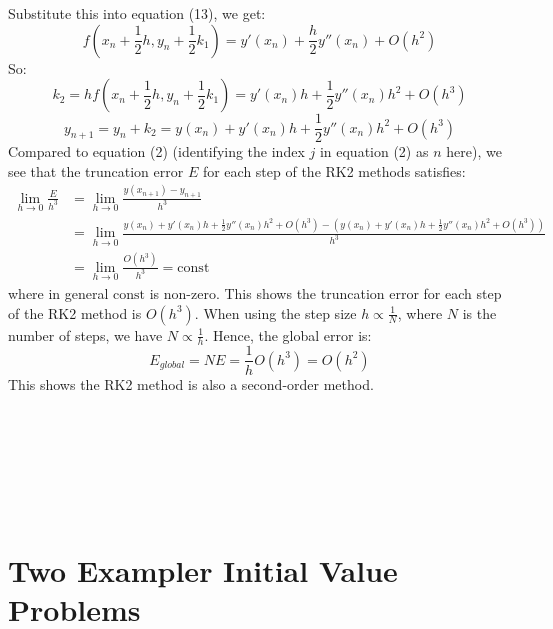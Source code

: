 \documentclass{article}
\begin{document}
Substitute this into equation (13), we get:
\begin{equation}
  f( x_n+ \frac{1}{2}h, y_n + \frac{1}{2}k_1)  = y'(x_n) + \frac{h}{2} y''(x_n)  +O(h^2)
\end{equation}
So:
\begin{equation}
  k_2 = h f( x_n+ \frac{1}{2}h, y_n + \frac{1}{2}k_1)  = y'(x_n)h + \frac{1}{2} y''(x_n) h^2 + O(h^3)
\end{equation}
\begin{equation}
  y_{n+1} = y_n +k_2 = y(x_n) +  y'(x_n)h + \frac{1}{2} y''(x_n) h^2 + O(h^3)
\end{equation}
Compared to equation (2) (identifying the index \(j\) in equation (2) as \(n\) here), we see that
the truncation error \(E\) for each step of the RK2 methods satisfies:
\begin{align}
    \lim_{h\to 0} \frac{E}{h^3}
    & = \lim_{h\to 0} \frac{y(x_{n+1}) - y_{n+1}}{h^3}\\
    & = \lim_{h\to 0} \frac{y(x_n) +  y'(x_n)h + \frac{1}{2} y''(x_n) h^2 + O(h^3) - (y(x_n) +  y'(x_n)h + \frac{1}{2} y''(x_n) h^2 + O(h^3))}{h^3}\\
    &= \lim_{h\to 0} \frac{O(h^3)}{h^3} = \text{const}
\end{align}
where in general \(\text{const}\) is non-zero. This shows the truncation error for each step of the RK2 method
is \(O(h^3)\). When using the step size \(h \propto \frac{1}{N}\), where \(N\) is the number of steps, we have \(N \propto \frac{1}{h}\). Hence, the global error is:
\begin{equation}
  E_{global} = N E  = \frac{1}{h} O(h^3) = O(h^2)
\end{equation}
This shows the RK2 method is also a second-order method.\\ \\  \\  \\ \\ \\
\\
\section{Two Exampler Initial Value Problems}
\end{document}
